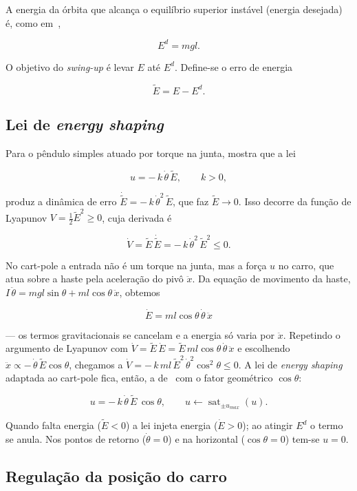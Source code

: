 \documentclass[brazil, 12pt]{article}
\begin{document}
A energia da órbita que alcança o equilíbrio superior instável (energia
desejada) é, como em~\cite{mit},

\[
E^{d} = m g l.
\]

O objetivo do \emph{swing-up} é levar $E$ até $E^{d}$. Define-se o erro de energia

\[
\tilde{E} = E - E^{d}.
\]

\subsection{Lei de \emph{energy shaping}}

Para o pêndulo simples atuado por torque na junta, \cite{mit} mostra que a lei

\[
u = -\,k\,\dot{\theta}\,\tilde{E}, \qquad k>0,
\]

produz a dinâmica de erro $\dot{\tilde{E}} = -\,k\,\dot{\theta}^{2}\,\tilde{E}$,
que faz $\tilde{E}\to 0$. Isso decorre da função de Lyapunov
$V = \tfrac{1}{2}\tilde{E}^{2}\ge 0$, cuja derivada é

\[
\dot{V} = \tilde{E}\,\dot{\tilde{E}}
        = -\,k\,\dot{\theta}^{2}\,\tilde{E}^{2} \le 0.
\]

No cart-pole a entrada não é um torque na junta, mas a força $u$ no carro, que
atua sobre a haste pela aceleração do pivô $\ddot{x}$. Da equação de movimento
da haste, $I\,\ddot{\theta} = m g l\sin\theta + m l\cos\theta\,\ddot{x}$,
obtemos

\[
\boxed{\;\dot{E} = m l\cos\theta\,\dot{\theta}\,\ddot{x}\;}
\]

--- os termos gravitacionais se cancelam e a energia só varia por $\ddot{x}$.
Repetindo o argumento de Lyapunov com
$\dot{V} = \tilde{E}\,\dot{E} = \tilde{E}\,m l\cos\theta\,\dot{\theta}\,\ddot{x}$
e escolhendo $\ddot{x}\propto -\,\dot{\theta}\,\tilde{E}\cos\theta$, chegamos a
$\dot{V} = -\,k\,m l\,\tilde{E}^{2}\,\dot{\theta}^{2}\cos^{2}\theta \le 0$. A lei
de \emph{energy shaping} adaptada ao cart-pole fica, então, a de~\cite{mit} com
o fator geométrico $\cos\theta$:

\[
\boxed{\;u = -\,k\,\dot{\theta}\,\tilde{E}\,\cos\theta,
\qquad u \leftarrow \operatorname{sat}_{\pm u_{max}}(u).\;}
\]

Quando falta energia ($\tilde{E}<0$) a lei injeta energia
($\dot{E}>0$); ao atingir $E^{d}$ o termo se anula. Nos pontos de retorno
($\dot{\theta}=0$) e na horizontal ($\cos\theta=0$) tem-se $u=0$.

\subsection{Regulação da posição do carro}
\end{document}
